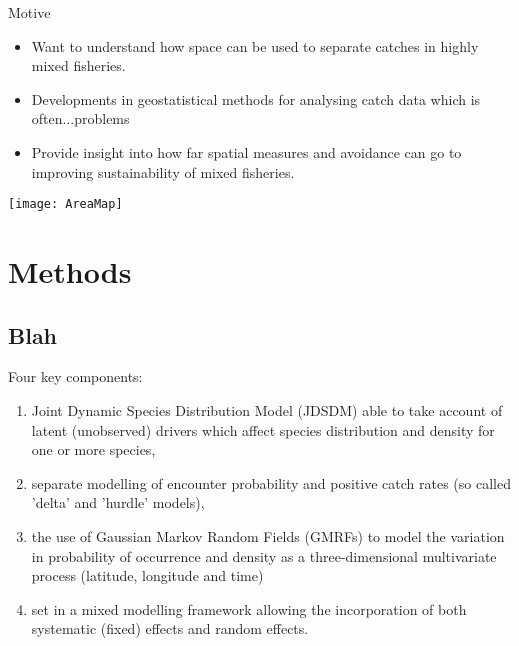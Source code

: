 \documentclass[xcolor=x11names,compress]{beamer}
\renewcommand{\(}{\begin{columns}}
\renewcommand{\)}{\end{columns}}
\newcommand{\<}[1]{\begin{column}{#1}}
\renewcommand{\>}{\end{column}}
\begin{document}
\begin{frame}{Motive}
	\begin{itemize}
		\item Want to understand how space can be used to separate
			catches in highly mixed fisheries.
		\item Developments in geostatistical methods for analysing
			catch data which is often...problems 
		\item Provide insight into how far spatial measures and
			avoidance can go to improving sustainability of mixed
			fisheries.
	\end{itemize}
	
	\texttt{[image: AreaMap]}

\end{frame}


\section{Methods}
\subsection{Blah}

\begin{frame}

Four key components:

\begin{enumerate}
	\small
	\setlength\itemsep{2em}

	\item Joint Dynamic Species Distribution Model (JDSDM) able to take
		account of latent (unobserved) drivers which affect species
		distribution and density for one or more species, 
	\item separate modelling of encounter probability and positive catch
		rates (so called 'delta' and 'hurdle' models), 
	\item the use of Gaussian Markov Random Fields (GMRFs) to model the
		variation in probability of occurrence and density as a
		three-dimensional multivariate process (latitude, longitude and
		time) 
	\item set in a mixed modelling framework allowing the incorporation of
		both systematic (fixed) effects and random effects. 

\end{enumerate}

\end{frame}
\end{document}
